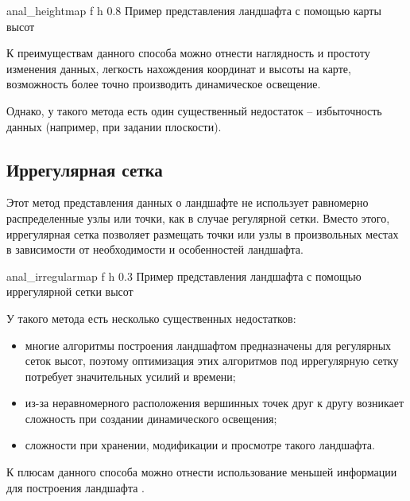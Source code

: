 \clearpage

{anal_heightmap} %
{f} %
{h} %
{0.8\textwidth} %
{Пример представления ландшафта с помощью карты высот} %

К преимуществам данного способа можно отнести наглядность и простоту изменения данных, легкость нахождения координат и высоты на карте, возможность более точно производить динамическое освещение. 

Однако, у такого метода есть один существенный недостаток -- избыточность данных (например, при задании плоскости).

\subsection{Иррегулярная сетка}

Этот метод представления данных о  ландшафте не использует равномерно распределенные узлы или точки, как в случае регулярной сетки. Вместо этого, иррегулярная сетка позволяет размещать точки или узлы в произвольных местах в зависимости от необходимости и особенностей ландшафта.

{anal_irregularmap} %
{f} %
{h} %
{0.3\textwidth} %
{Пример представления ландшафта с помощью иррегулярной сетки высот} %

У такого метода есть несколько существенных недостатков:

\begin{itemize}[label=--]
	\item многие алгоритмы построения ландшафтом предназначены для регулярных сеток высот, поэтому оптимизация этих алгоритмов под иррегулярную сетку потребует значительных усилий и времени;
	\item из-за неравномерного расположения вершинных точек друг к другу возникает сложность при создании динамического освещения;
	\item сложности при хранении, модификации и просмотре такого ландшафта.
\end{itemize}

К плюсам данного способа можно отнести использование меньшей информации для построения ландшафта \cite{datalands}. 

